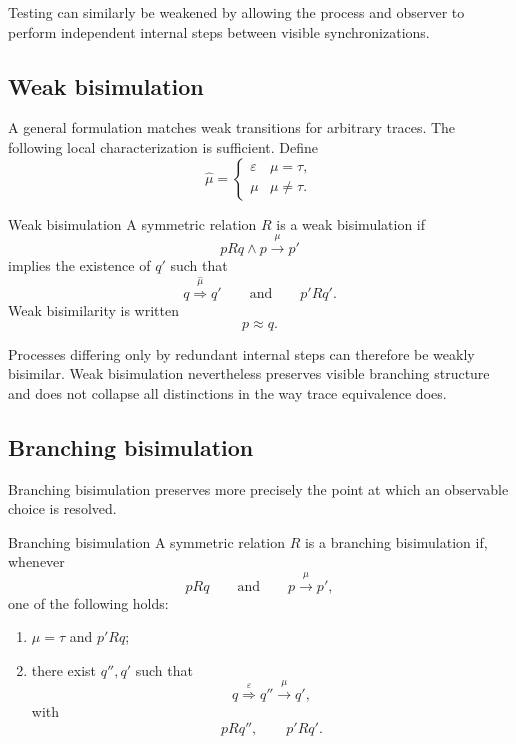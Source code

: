 \documentclass[a4paper]{article}
\newcommand{\eps}{\varepsilon}
\newcommand{\trans}[1]{\xrightarrow{#1}}
\newcommand{\wtrans}[1]{\mathrel{\overset{#1}{\Rightarrow}}}
\begin{document}
Testing can similarly be weakened by allowing the process and observer to perform independent internal steps between visible synchronizations.

\subsection{Weak bisimulation}

A general formulation matches weak transitions for arbitrary traces.
The following local characterization is sufficient.
Define
\[
    \widehat\mu
    =
    \begin{cases}
        \eps & \mu=\tau,\\
        \mu & \mu\neq\tau.
    \end{cases}
\]

\begin{snippetdefinition}{Weak bisimulation}
    A symmetric relation \(R\) is a weak bisimulation if
    \[
        pRq
        \land
        p\trans{\mu}p'
    \]
    implies the existence of \(q'\) such that
    \[
        q\wtrans{\widehat\mu}q'
        \qquad\text{and}\qquad
        p'Rq'.
    \]
    Weak bisimilarity is written
    \[
        p\approx q.
    \]
\end{snippetdefinition}

Processes differing only by redundant internal steps can therefore be weakly bisimilar.
Weak bisimulation nevertheless preserves visible branching structure and does not collapse all distinctions in the way trace equivalence does.

\subsection{Branching bisimulation}

Branching bisimulation preserves more precisely the point at which an observable choice is resolved.

\begin{snippetdefinition}{Branching bisimulation}
    A symmetric relation \(R\) is a branching bisimulation if, whenever
    \[
        pRq
        \qquad\text{and}\qquad
        p\trans{\mu}p',
    \]
    one of the following holds:
    \begin{enumerate}
        \item \(\mu=\tau\) and \(p'Rq\);
        \item there exist \(q'',q'\) such that
        \[
            q\wtrans{\eps}q''\trans{\mu}q',
        \]
        with
        \[
            pRq'',
            \qquad
            p'Rq'.
        \]
    \end{enumerate}
\end{snippetdefinition}
\end{document}

